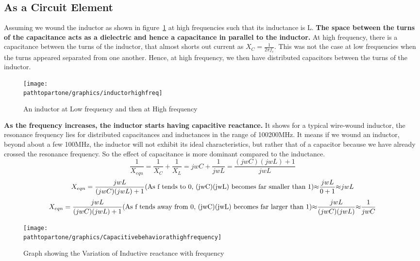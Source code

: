\subsection{As a Circuit Element}\label{sec:circuitelement}

Assuming we wound the inductor as shown in figure~\ref{fig:group10diagram3} at high frequencies such that its inductance is L. \textbf{The space between the turns of the capacitance acts as a dielectric and hence a capacitance in parallel to the inductor.} At high frequency, there is a capacitance between the turns of the inductor, that almost shorts out current as $X_{C} = \frac{1}{2\pi f_c}$. This was not the case at low frequencies when the turns appeared separated from one another. Hence, at high frequency, we then have distributed capacitors between the turns of the inductor.
\begin{figure}[ht]
	\centering
	\texttt{[image: \\pathtopartone/graphics/inductorhighfreq]}
	\caption{An inductor at Low frequency and then at High frequency}
	\label{fig:group10diagram3}
\end{figure}

\textbf{As the frequency increases, the inductor starts having capacitive reactance.} It shows for a typical wire-wound inductor, the resonance frequency lies for distributed capacitances and inductances in the range of 100\textemdash\;200MHz. It means if we wound an inductor, beyond about a few 100MHz, the inductor will not exhibit its ideal characteristics, but rather that of a capacitor because we have already crossed the resonance frequency. So the effect of capacitance is more dominant compared to the inductance.
\begin{dmath}
	\frac{1}{X_{eqn}} = \frac{1}{X_C} + \frac{1}{X_L}
					  = jwC + \frac{1}{jwL}
					  = \frac{(jwC)(jwL) + 1}{jwL}
\end{dmath}
\begin{dmath}	
	X_{eqn} = \frac{jwL}{(jwC)(jwL) + 1} \\
			  \text{({As f tends to 0, (jwC)(jwL) becomes far smaller than 1})} \\
                {\approx} \frac{jwL}{0 + 1}\\
                {\approx} {jwL}            
\end{dmath}
\begin{dmath}	
	X_{eqn} = \frac{jwL}{(jwC)(jwL) + 1} \\
			\text{({As f tends away from 0, (jwC)(jwL) becomes far larger than 1})} \\
                {\approx} \frac{jwL}{(jwC)(jwL)}\\
                {\approx} \frac{1}{jwC}\\
\end{dmath}
\begin{figure}[ht]
	\centering
	\texttt{[image: \\pathtopartone/graphics/Capacitivebehaviorathighfrequency]}
	\caption{Graph showing the Variation of Inductive reactance with frequency}
	\label{fig:Capacitivebehaviorathighfrequency}
\end{figure}

